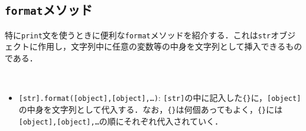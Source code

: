 \begin{cod}[\texttt{py3.py}]　
}]{code/py3.py}
\vspace{-7pt}
\begin{lstlisting}
<class 'str'>
<class 'type'>
\end{lstlisting}
\end{cod}
\vspace{-10pt}

\subsection{\texttt{format}メソッド}

特に\texttt{print}文を使うときに便利な\texttt{format}メソッドを紹介する．これは\texttt{str}オブジェクトに作用し，文字列中に任意の変数等の中身を文字列として挿入できるものである．

\begin{gram}　
\begin{itemize}
\item \texttt{[str].format([object],[object],\ldots)}: \texttt{[str]}の中に記入した\texttt{\{\}}に，\texttt{[object]}の中身を文字列として代入する．なお，\texttt{\{\}}は何個あってもよく，\texttt{\{\}}には\texttt{[object],[object],\ldots}の順にそれぞれ代入されていく．
\end{itemize}
\end{gram}

\begin{cod}[\texttt{py4.py}]　
}]{code/py4.py}
\vspace{-7pt}
\begin{lstlisting}
p={'x': 3, 'y': 5}, type=<class 'dict'>
\end{lstlisting}
\end{cod}
\vspace{-10pt}
